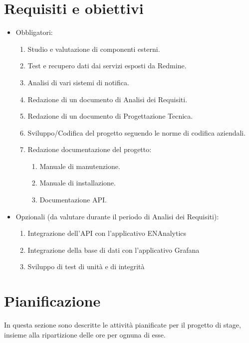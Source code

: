 \section{Requisiti e obiettivi}
\begin{itemize}
	\item Obbligatori:
		\begin{enumerate}
			\item Studio e valutazione di componenti esterni.
			\item Test e recupero dati dai servizi esposti da Redmine.
			\item Analisi di vari sistemi di notifica.
			\item Redazione di un documento di Analisi dei Requisiti.
			\item Redazione di un documento di Progettazione Tecnica.
			\item Sviluppo/Codifica del progetto seguendo le norme di codifica aziendali.
			\item Redazione documentazione del progetto:
				\begin{enumerate}
					\item Manuale di manutenzione.
					\item Manuale di installazione.
					\item Documentazione API.
				\end{enumerate}
		\end{enumerate}
	\item Opzionali (da valutare durante il periodo di Analisi dei Requisiti):
	\begin{enumerate}
		\item Integrazione dell'API con l'applicativo ENAnalytics
		\item Integrazione della base di dati con l'applicativo Grafana
		\item Sviluppo di test di unità e di integrità
	\end{enumerate}
\end{itemize}

\section{Pianificazione}
In questa sezione sono descritte le attività pianificate per il progetto di stage, insieme alla ripartizione delle ore per ognuna di esse.

